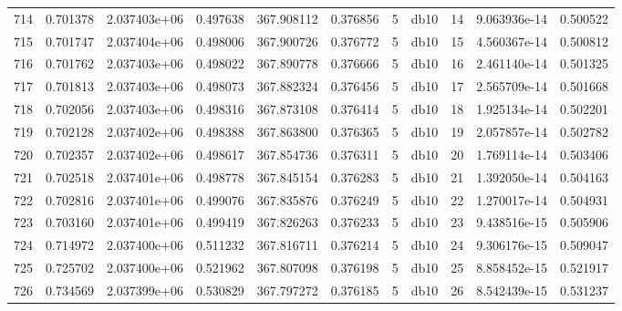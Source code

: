 \begin{tabular}{lrrrrrrlrrr}
714  &    0.701378 &        2.037403e+06 &  0.497638 &              367.908112 &    0.376856 &       5 &         db10 &     14 &   9.063936e-14 &      0.500522 \\
715  &    0.701747 &        2.037404e+06 &  0.498006 &              367.900726 &    0.376772 &       5 &         db10 &     15 &   4.560367e-14 &      0.500812 \\
716  &    0.701762 &        2.037403e+06 &  0.498022 &              367.890778 &    0.376666 &       5 &         db10 &     16 &   2.461140e-14 &      0.501325 \\
717  &    0.701813 &        2.037403e+06 &  0.498073 &              367.882324 &    0.376456 &       5 &         db10 &     17 &   2.565709e-14 &      0.501668 \\
718  &    0.702056 &        2.037403e+06 &  0.498316 &              367.873108 &    0.376414 &       5 &         db10 &     18 &   1.925134e-14 &      0.502201 \\
719  &    0.702128 &        2.037402e+06 &  0.498388 &              367.863800 &    0.376365 &       5 &         db10 &     19 &   2.057857e-14 &      0.502782 \\
720  &    0.702357 &        2.037402e+06 &  0.498617 &              367.854736 &    0.376311 &       5 &         db10 &     20 &   1.769114e-14 &      0.503406 \\
721  &    0.702518 &        2.037401e+06 &  0.498778 &              367.845154 &    0.376283 &       5 &         db10 &     21 &   1.392050e-14 &      0.504163 \\
722  &    0.702816 &        2.037401e+06 &  0.499076 &              367.835876 &    0.376249 &       5 &         db10 &     22 &   1.270017e-14 &      0.504931 \\
723  &    0.703160 &        2.037401e+06 &  0.499419 &              367.826263 &    0.376233 &       5 &         db10 &     23 &   9.438516e-15 &      0.505906 \\
724  &    0.714972 &        2.037400e+06 &  0.511232 &              367.816711 &    0.376214 &       5 &         db10 &     24 &   9.306176e-15 &      0.509047 \\
725  &    0.725702 &        2.037400e+06 &  0.521962 &              367.807098 &    0.376198 &       5 &         db10 &     25 &   8.858452e-15 &      0.521917 \\
726  &    0.734569 &        2.037399e+06 &  0.530829 &              367.797272 &    0.376185 &       5 &         db10 &     26 &   8.542439e-15 &      0.531237 \\

\end{tabular}
